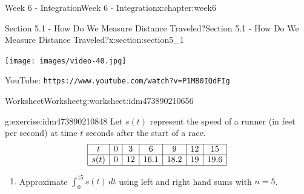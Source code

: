 \documentclass[oneside,10pt,]{book}
\newcommand{\mono}[1]{\texttt{#1}}
\numberwithin{equation}{section}
\newlength{\qrsize}
\newlength{\previewwidth}
\newcommand{\amp}{&}
\begin{document}
\begin{chapterptx}{Week 6 - Integration}{}{Week 6 - Integration}{}{}{x:chapter:week6}
%
%
\typeout{************************************************}
\typeout{************************************************}
%
\begin{sectionptx}{Section 5.1 - How Do We Measure Distance Traveled?}{}{Section 5.1 - How Do We Measure Distance Traveled?}{}{}{x:section:section5_1}
\setlength{\qrsize}{9em}
\setlength{\previewwidth}{\linewidth}
\addtolength{\previewwidth}{-\qrsize}
\begin{tcbraster}[raster columns=2, raster column skip=1pt, raster halign=center, raster force size=false, raster left skip=0pt, raster right skip=0pt]%
\begin{tcolorbox}[previewstyle, width=\previewwidth]%
\texttt{[image: images/video-40.jpg]}%
\end{tcolorbox}%
\begin{tcolorbox}[qrstyle]%
{\hypersetup{urlcolor=black}}%
\end{tcolorbox}%
\begin{tcolorbox}[captionstyle]%
\small YouTube: \mono{https://www.youtube.com/watch?v=P1MB0IQdFIg}\end{tcolorbox}%
\end{tcbraster}%
%
%
\typeout{************************************************}
\typeout{************************************************}
%
\begin{worksheet-subsection}{Worksheet}{}{Worksheet}{}{}{g:worksheet:idm473890210656}
\begin{divisionexercise}{1}{}{}{g:exercise:idm473890210848}%
Let \(s(t)\) represent the speed of a runner (in feet per second) at time \(t\) seconds after the start of a race.%
\begin{equation*}
\begin{array} {| c | c | c | c | c | c | c |}
\hline t \amp 0 \amp 3 \amp 6 \amp 9 \amp 12 \amp 15 \\
\hline s(t) \amp 0 \amp 12 \amp 16.1 \amp 18.2 \amp 19 \amp 19.6 \\
\hline
\end{array}
\end{equation*}
%
%
\begin{enumerate}[label=(\alph*)]
\item{}Approximate \(\displaystyle{\int_0^{15} s(t) \,dt}\) using left and right hand sums with \(n=5\).%

\end{enumerate}
\end{divisionexercise}
\end{worksheet-subsection}
\end{sectionptx}
\end{chapterptx}
\end{document}
